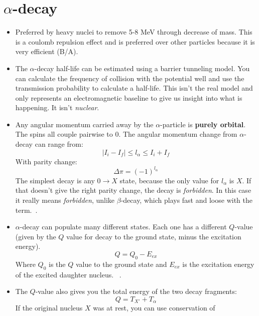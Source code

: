 \documentclass[letter]{article}
\begin{document}
\section{$\alpha$-decay}

\begin{itemize}
\item Preferred by heavy nuclei to remove 5-8 MeV through decrease of
  mass. This is a coulomb repulsion effect and is preferred over other
  particles because it is very efficient (B/A). 
\item The $\alpha$-decay half-life can be estimated using a barrier
  tunneling model. You can calculate the frequency of collision with
  the potential well and use the transmission probability to calculate
  a half-life. This isn't the real model and only represents an
  electromagnetic baseline to give us insight into what is
  happening. It isn't \textit{nuclear}.~\cite[Lec. 18]{lecture}
\item Any angular momentum carried away by the $\alpha$-particle is
  \textbf{purely orbital}. The spins all couple pairwise to
  0. The angular momentum change from $\alpha$-decay can range from:
  \begin{equation*}
    |I_i-I_f| \leq l_{\alpha} \leq I_i + I_f
  \end{equation*}
With parity change:
\begin{equation*}
  \Delta\pi = {(-1)}^{l_{\alpha}}
\end{equation*}
The simplest decay is any $0 \to X$ state, because the only value
for $l_{\alpha}$ is $X$. If that doesn't give the right parity change,
the decay is \textit{forbidden}. In this case it really means
\textit{forbidden}, unlike $\beta$-decay, which plays fast and loose
with the term.~\cite[pp. 257-258]{krane}.
\item $\alpha$-decay can populate many different states. Each one has
  a different $Q$-value (given by the $Q$ value for decay to the
  ground state, minus the excitation
  energy).
  \begin{equation*}
    Q = Q_0 - E_{ex}
  \end{equation*}
Where $Q_0$ is the $Q$ value to the ground state and $E_{ex}$ is the
excitation energy of the excited daughter nucleus.
~\cite[pp. 257-258]{krane}.
\item The $Q$-value also gives you the total energy of the two decay
  fragments:
  \begin{equation*}
    Q=T_{X'}+T_{\alpha}
  \end{equation*}
If the original nucleus $X$ was at rest, you can use conservation of

\end{itemize}
\end{document}
